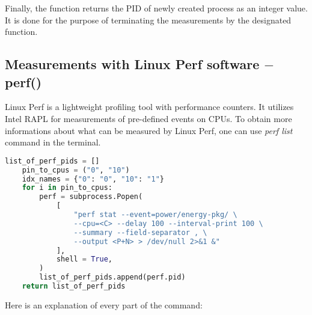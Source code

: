 Finally, the function returns the PID of newly created process
as an integer value. It is done for the purpose of terminating the
measurements by the designated function.

\newpage

\subsection{Measurements with Linux Perf software $-$ perf\@()}

Linux Perf is a lightweight profiling tool with performance counters.
It utilizes Intel RAPL for measurements of pre-defined events on CPUs.
To obtain more informations about what can be measured by Linux Perf,
one can use \emph{perf list} command in the terminal.

\begin{lstlisting}[language=Python]
    list_of_perf_pids = []
    pin_to_cpus = ("0", "10")
    idx_names = {"0": "0", "10": "1"}
    for i in pin_to_cpus:
        perf = subprocess.Popen(
            [
                "perf stat --event=power/energy-pkg/ \
                --cpu=<C> --delay 100 --interval-print 100 \
                --summary --field-separator , \
                --output <P+N> > /dev/null 2>&1 &"
            ],
            shell = True,
        )
        list_of_perf_pids.append(perf.pid)
    return list_of_perf_pids
\end{lstlisting}

Here is an explanation of every part of the command:


